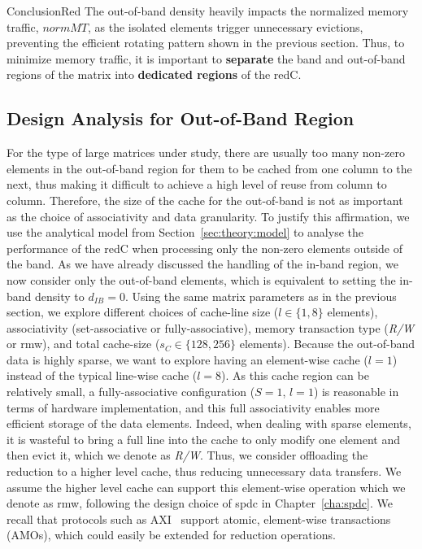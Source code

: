 \begin{highlight}{Conclusion}{Red}
    The out-of-\gls{band} density heavily impacts the normalized memory traffic, $\mathit{normMT}$, as the isolated elements trigger unnecessary \glspl{eviction}, preventing the efficient rotating pattern shown in the previous section.
    Thus, to minimize memory traffic, it is important to \textbf{separate} the \gls{band} and out-of-\gls{band} regions of the matrix into \textbf{dedicated regions} of the \gls{redC}.
\end{highlight}

\subsection{Design Analysis for Out-of-Band Region}
\label{sec:theory:graph2}

For the type of large matrices under study, there are usually too many non-zero elements in the out-of-\gls{band} region for them to be cached from one column to the next, thus making it difficult to achieve a high level of reuse from column to column.
Therefore, the size of the cache for the out-of-\gls{band} is not as important as the choice of associativity and data granularity.
To justify this affirmation, we use the analytical model from Section~\ref{sec:theory:model} to analyse the performance of the \gls{redC} when processing only the non-zero elements outside of the \gls{band}.
As we have already discussed the handling of the in-\gls{band} region, we now consider only the out-of-\gls{band} elements, which is equivalent to setting the in-\gls{band} density to $d_\mathit{IB} = 0$.
Using the same matrix parameters as in the previous section, we explore different choices of cache-line size ($l \in \{1, 8\}$ elements), associativity (\gls{set}-associative or fully-associative), memory transaction type (\textit{R/W} or \acrshort{rmw}), and total cache-size ($s_C \in \{128, 256\}$ elements).
Because the out-of-\gls{band} data is highly sparse, we want to explore having an element-wise cache ($l = 1$) instead of the typical line-wise cache ($l = 8$).
As this cache region can be relatively small, a fully-associative configuration ($S = 1$, $l = 1$) is reasonable in terms of hardware implementation, and this full associativity enables more efficient storage of the data elements.
Indeed, when dealing with sparse elements, it is wasteful to bring a full line into the cache to only modify one element and then evict it, which we denote as \textit{R/W}.
Thus, we consider offloading the \gls{reduction} to a higher level cache, thus reducing unnecessary data transfers.
We assume the higher level cache can support this element-wise operation which we denote as \acrshort{rmw}, following the design choice of \acrlong{spdc} in Chapter~\ref{cha:spdc}.
We recall that protocols such as AXI~\cite{ARM2023_AXI} support atomic, element-wise transactions (AMOs), which could easily be extended for \gls{reduction} operations.

